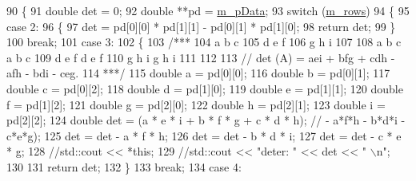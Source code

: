 \begin{DoxyCode}
90         \{
91             \textcolor{keywordtype}{double} det = 0;
92             \textcolor{keywordtype}{double} **pd = \hyperlink{classCMatrix_ab0f18d68cad9b6d750d05a96b60a759d}{m\_pData};
93             \textcolor{keywordflow}{switch} (\hyperlink{classCMatrix_ae23e5f8016ba06cfd1cce364a99f5037}{m\_rows})
94             \{
95                 \textcolor{keywordflow}{case} 2:
96                 \{
97                     det = pd[0][0] * pd[1][1] - pd[0][1] * pd[1][0];
98                     \textcolor{keywordflow}{return} det;
99                 \}
100                     \textcolor{keywordflow}{break};
101                 \textcolor{keywordflow}{case} 3:
102                 \{
103                     \textcolor{comment}{/***}
104 \textcolor{comment}{                     a b c}
105 \textcolor{comment}{                     d e f}
106 \textcolor{comment}{                     g h i}
107 \textcolor{comment}{ }
108 \textcolor{comment}{                     a b c a b c}
109 \textcolor{comment}{                     d e f d e f}
110 \textcolor{comment}{                     g h i g h i}
111 \textcolor{comment}{ }
112 \textcolor{comment}{ }
113 \textcolor{comment}{                     // det (A) = aei + bfg + cdh - afh - bdi - ceg.}
114 \textcolor{comment}{                     ***/}
115                     \textcolor{keywordtype}{double} a = pd[0][0];
116                     \textcolor{keywordtype}{double} b = pd[0][1];
117                     \textcolor{keywordtype}{double} c = pd[0][2];
118                     \textcolor{keywordtype}{double} d = pd[1][0];
119                     \textcolor{keywordtype}{double} e = pd[1][1];
120                     \textcolor{keywordtype}{double} f = pd[1][2];
121                     \textcolor{keywordtype}{double} g = pd[2][0];
122                     \textcolor{keywordtype}{double} h = pd[2][1];
123                     \textcolor{keywordtype}{double} i = pd[2][2];
124                     \textcolor{keywordtype}{double} det = (a * e * i + b * f * g + c * d * h); \textcolor{comment}{// - a*f*h - b*d*i - c*e*g);}
125                     det = det - a * f * h;
126                     det = det - b * d * i;
127                     det = det - c * e * g;
128                     \textcolor{comment}{//std::cout << *this;}
129                     \textcolor{comment}{//std::cout << "deter: " << det << " \(\backslash\)n";}
130  
131                     \textcolor{keywordflow}{return} det;
132                 \}
133                     \textcolor{keywordflow}{break};
134                 \textcolor{keywordflow}{case} 4:

\end{DoxyCode}
